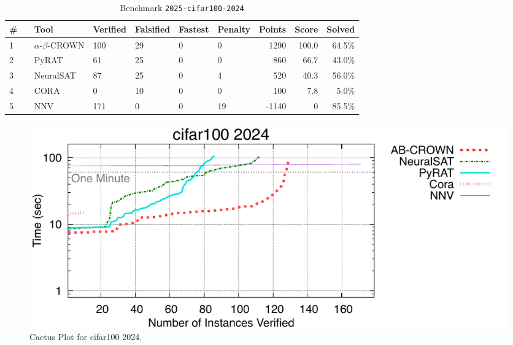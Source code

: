 \begin{table}[h]
\begin{center}
\caption{Benchmark \texttt{2025-cifar100-2024}} \label{tab:cat_2025_cifar100_2024}
{\setlength{\tabcolsep}{2pt}
\begin{tabular}[h]{@{}llllllrrr@{}}
\toprule
\textbf{\# ~} & \textbf{Tool} & \textbf{Verified} & \textbf{Falsified} & \textbf{Fastest} & \textbf{Penalty} & \textbf{Points} & \textbf{Score} & \textbf{Solved}\\
\midrule
1 & $\alpha$-$\beta$-CROWN & 100 & 29 & 0 & 0 & 1290 & 100.0 & 64.5\% \\
2 & PyRAT & 61 & 25 & 0 & 0 & 860 & 66.7 & 43.0\% \\
3 & NeuralSAT & 87 & 25 & 0 & 4 & 520 & 40.3 & 56.0\% \\
4 & CORA & 0 & 10 & 0 & 0 & 100 & 7.8 & 5.0\% \\
5 & NNV & 171 & 0 & 0 & 19 & -1140 & 0 & 85.5\% \\
\bottomrule
\end{tabular}
}
\end{center}
\end{table}



\begin{figure}[h]
\centerline{\includegraphics[width=\textwidth]{cactus/2025_cifar100_2024.pdf}}
\caption{Cactus Plot for cifar100 2024.}
\label{fig:quantPic}
\end{figure}


\clearpage

